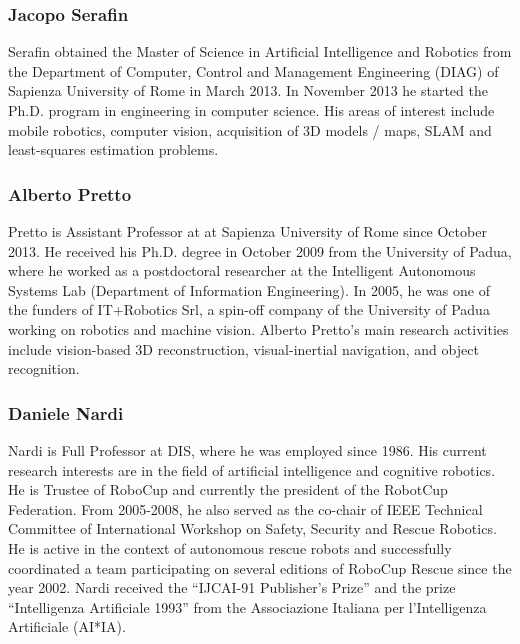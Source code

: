 \documentclass[conference]{IEEEtran}
\begin{document}
\subsubsection*{Jacopo Serafin}
Serafin obtained the Master of Science in Artificial Intelligence and Robotics from the Department of Computer, Control and Management Engineering (DIAG) of Sapienza University of Rome in March 2013. 
In November 2013 he started the Ph.D. program in engineering in computer science. His areas of interest include mobile robotics, computer vision, acquisition of 3D models / maps, SLAM and least-squares estimation problems.
\subsubsection*{Alberto Pretto}
Pretto is Assistant Professor at at Sapienza University of Rome since October 2013. 
He received his Ph.D. degree in October 2009 from the University of Padua, where he worked as a postdoctoral researcher at the Intelligent Autonomous Systems Lab (Department of Information Engineering). 
In 2005, he was one of the funders of IT+Robotics Srl, a spin-off company of the University of Padua working on robotics and machine vision. 
Alberto Pretto's main research activities include vision-based 3D reconstruction, visual-inertial navigation, and object recognition.
\subsubsection*{Daniele Nardi}
Nardi is Full Professor at DIS, where he was employed since 1986. His current research interests are in the field of artificial intelligence and cognitive robotics. He is Trustee of RoboCup and currently the president of the RobotCup Federation.  From 2005-2008, he also served as the co-chair of IEEE Technical Committee of International Workshop on Safety, Security and Rescue Robotics.  He is active in the context of autonomous rescue robots and successfully coordinated a team participating on several editions of RoboCup Rescue since the year 2002.  
Nardi received the ``IJCAI-91 Publisher's Prize'' and the prize ``Intelligenza Artificiale 1993'' from the Associazione Italiana per l'Intelligenza Artificiale (AI*IA).
\end{document}
